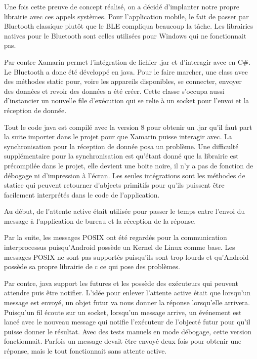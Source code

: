 \documentclass[12pt,fleqn]{article}
\begin{document}
Une fois cette preuve de concept réalisé, on a décidé d'implanter notre propre librairie avec ces appels systèmes. Pour l'application mobile, le fait de passer par Bluetooth classique plutôt que le BLE compliqua beaucoup la tâche. Les librairies natives pour le Bluetooth sont celles utilisées pour Windows qui ne fonctionnait pas.

Par contre Xamarin permet l'intégration de fichier .jar et d'interagir avec en C\#. Le Bluetooth a donc été développé en java. Pour le faire marcher, une class avec des méthodes static pour, voire les appareils disponibles, se connecter, envoyer des données et revoir des données a été créer. Cette classe s'occupa aussi d'instancier un nouvelle file d'exécution qui se relie à un socket pour l'envoi et la réception de donnée. 

Tout le code java est compilé avec la version 8 pour obtenir un .jar qu'il faut part la suite importer dans le projet pour que Xamarin puisse interagir avec. La synchronisation pour la réception de donnée posa un problème. Une difficulté supplémentaire pour la synchronisation est qu’étant donné que la librairie est précompilée dans le projet, elle devient une boite noire, il n'y a pas de fonction de débogage ni d'impression à l'écran. Les seules intégrations sont les méthodes de statice qui peuvent retourner d’abjects primitifs pour qu'ils puissent être facilement interprétés dans le code de l'application.

Au début, de l'attente active était utilisée pour passer le temps entre l'envoi du message à l'application de bureau et la réception de la réponse. 

Par la suite, les messages POSIX ont été regardés pour la communication interprocessus puisqu’Android possède un Kernel de Linux comme base. Les messages POSIX ne sont pas supportés puisqu'ils sont trop lourds et qu'Android possède sa propre librairie de c ce qui pose des problèmes. 

Par contre, java support les futures et les possède des exécuteurs qui peuvent attendre puis être notifier. L'idée pour enlever l'attente active était que lorsqu'un message est envoyé, un objet futur va nous donner la réponse lorsqu'elle arrivera. Puisqu'un fil écoute sur un socket, lorsqu'un message arrive, un événement est lancé avec le nouveau message qui notifie l'exécuteur de l'objecté futur pour qu'il puisse donner le résultat. Avec des tests manuels en mode débogage, cette version fonctionnait. Parfois un message devait être envoyé deux fois pour obtenir une réponse, mais le tout fonctionnait sans attente active. 
\end{document}
